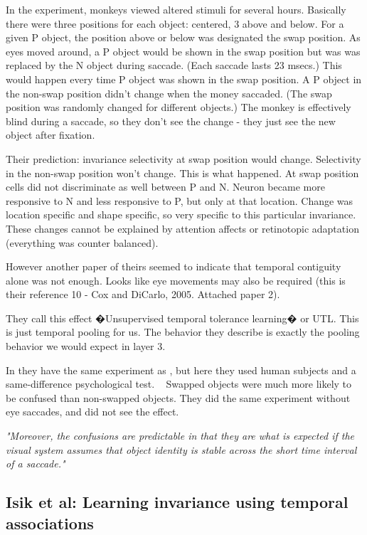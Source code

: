 \documentclass{article} %
\begin{document}
In the experiment, monkeys viewed altered stimuli for several hours. Basically
there were three positions for each object: centered, 3 above and below. For a
given P object, the position above or below was designated the swap position.
As eyes moved around, a P object would be shown in the swap position but was was
replaced by the N object during saccade. (Each saccade lasts 23 msecs.) This
would happen every time P object was shown in the swap position.  A P object in
the non-swap position didn't change when the money saccaded. (The swap position
was randomly changed for different objects.)  The monkey is effectively blind
during a saccade, so they don't see the change - they just see the new object
after fixation.

Their prediction: invariance selectivity at swap position would change.
Selectivity in the non-swap position won't change.  This is what happened. At
swap position cells did not discriminate as well between P and N. Neuron became
more responsive to N and less responsive to P, but only at that location. Change
was location specific and shape specific, so very specific to this particular
invariance. These changes cannot be explained by attention affects or
retinotopic adaptation (everything was counter balanced).

However another paper of theirs seemed to indicate that temporal contiguity
alone was not enough. Looks like eye movements may also be required (this is
their reference 10 - Cox and DiCarlo, 2005. Attached paper 2).

They call this effect �Unsupervised temporal tolerance learning� or UTL. This is
just temporal pooling for us.  The behavior they describe is exactly the pooling
behavior we would expect in layer 3.

In \cite{Cox2005} they have the same experiment as \cite{Li2008}, but
here they used human subjects and a same-difference psychological test.  
Swapped objects were much more likely to be confused than non-swapped objects.
They did the same experiment without eye saccades, and did not see the effect. 

\emph{"Moreover, the confusions are predictable in that they are what is
expected if the visual system assumes that object identity is stable across the short time
interval of a saccade."}


\subsection{Isik et al: Learning invariance using temporal associations}
\end{document}

